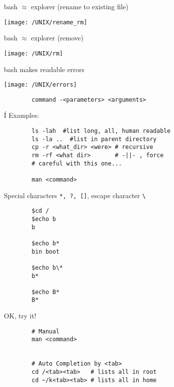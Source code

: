 \documentclass[xcolor=dvipsnames]{beamer}
\begin{document}
\begin{frame}
	bash $\approx$ explorer (rename to existing file)
	\begin{center}
		\texttt{[image: /UNIX/rename\_rm]}
	\end{center}
\end{frame}

\begin{frame}
	bash $\approx$ explorer (remove)
	\begin{center}
		\texttt{[image: /UNIX/rm]}
	\end{center}
\end{frame}

\begin{frame}
	bash makes readable errors
	\begin{center}
		\texttt{[image: /UNIX/errors]}
	\end{center}
\end{frame}

\begin{frame}[fragile]
	\begin{verbatim}
		command -<parameters> <arguments>
	\end{verbatim}Í
	Examples:
	\begin{verbatim}
		ls -lah  #list long, all, human readable
		ls -la ..  #list in parent directory
		cp -r <what_dir> <were> # recursive
		rm -rf <what dir>       # -||- , force
		# careful with this one...
		
		man <command>
	\end{verbatim}
\end{frame}

\begin{frame}[fragile]
	\Large
	Special characters \verb!*, ?, []!, escape character \verb!\!
	\begin{verbatim}
		$cd /
		$echo b
		b
		
		$echo b*
		bin boot
		
		$echo b\*
		b*
		
		$echo B*
		B*

	\end{verbatim}
\end{frame}

\begin{frame}[fragile]
	\Huge
	\begin{center}
		OK, try it!	
	\end{center}
	\Large
	\begin{verbatim}
		# Manual	
		man <command>
	
	
		# Auto Completion by <tab>
		cd /<tab><tab>   # lists all in root
		cd ~/k<tab><tab> # lists all in home
		
		
		
	\end{verbatim}
\end{frame}
\end{document}
